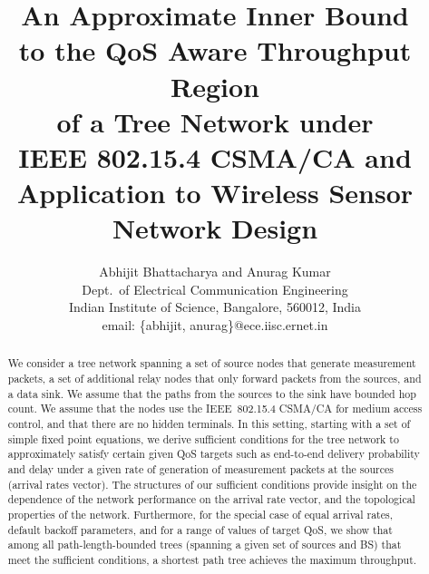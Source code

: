 \documentclass[12pt, draftclsnofoot, onecolumn]{IEEEtran}
\begin{document}
\title{An Approximate Inner Bound\\ to the QoS Aware Throughput Region\\ of a Tree Network under\\ IEEE 802.15.4 CSMA/CA and\\ Application to Wireless Sensor\\ Network Design}
\author{Abhijit Bhattacharya and Anurag Kumar\\Dept.\ of Electrical Communication Engineering\\Indian Institute of Science, Bangalore, 560012, India\\ email: \{abhijit, anurag\}@ece.iisc.ernet.in}




\maketitle

\begin{abstract}
We consider a tree network spanning a set of source nodes that generate measurement packets, a set of additional relay nodes that only forward packets from the sources, and a data sink. We assume that the paths from the sources to the sink have bounded hop count. We assume that the nodes use the IEEE~802.15.4 CSMA/CA for medium access control, and that there are no hidden terminals. In this setting, starting with a set of simple fixed point equations, we derive sufficient conditions for the tree network to approximately satisfy certain given QoS targets such as end-to-end delivery probability and delay under a given rate of generation of measurement packets at the sources (arrival rates vector). The structures of our sufficient conditions provide insight on the dependence of the network performance on the arrival rate vector, and the topological properties of the network. Furthermore, for the special case of equal arrival rates, default backoff parameters, and for a range of values of target QoS, we show that among all path-length-bounded trees (spanning a given set of sources and BS) that meet the sufficient conditions, a shortest path tree achieves the maximum throughput. 
\end{abstract}
\end{document}
